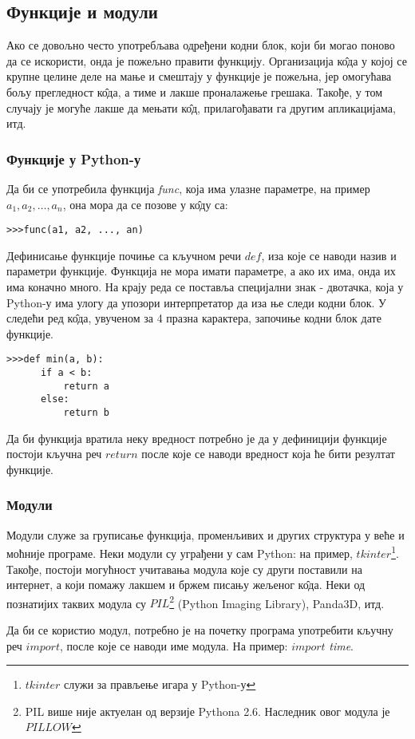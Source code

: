 \subsection{Функције и модули}

Ако се довољно често употребљава одређени кодни блок, који би могао поново да се искористи, онда је пожељно правити функцију. Организација к\^{о}да у којој се крупне целине деле на мање и смештају у функције је пожељна, јер омогућава бољу прегледност к\^{о}да, а тиме и лакше проналажење грешака. Такође, у том случају је могуће лакше да мењати к\^{о}д, прилагођавати га другим апликацијама, итд.

\subsubsection{Функције у Python-у}

Да би се употребила функција \emph{func}, која има улазне параметре, на пример $a_{1}, a_{2},\dots, a_{n}$, она мора да се позове у к\^{о}ду са:

\begin{lstlisting}
>>>func(a1, a2, ..., an)
\end{lstlisting}

Дефинисање функције почиње са кључном речи $def$, иза које се наводи назив и параметри функције. Функција не мора имати параметре, а ако их има, онда их има коначно много. На крају реда се поставља специјални знак - двотачка, која у Python-у има улогу да упозори интерпретатор да иза ње следи кодни блок. У следећи ред к\^{о}да, увученом за 4 празна карактера, започиње кодни блок дате функције.

\begin{lstlisting}[caption = Дефинисање функције, label = func]
>>>def min(a, b):
      if a < b:
          return a
      else:
          return b
\end{lstlisting}

Да би функција вратила неку вредност потребно је да у дефиницији функције постоји кључна реч $return$ после које се наводи вредност која ће бити резултат функције.

\subsubsection{Модули}

Модули служе за груписање функција, променљивих и других структура у веће и моћније програме. Неки модули су уграђени у сам Python: на пример, $tkinter$\footnote{$tkinter$ служи за прављење игара у Python-у}. Такође, постоји могућност учитавања модула које су други поставили на интернет, а који помажу лакшем и бржем писању жељеног к\^{о}да. Неки од познатијих таквих модула су $PIL$\footnote{PIL више није актуелан од верзије Pythona 2.6. Наследник овог модула је $PILLOW$}  (Python Imaging Library), Panda3D, итд.

Да би се користио модул, потребно је на почетку програма употребити кључну реч $import$, после које се наводи име модула. На пример: $import$ \emph{time}.
